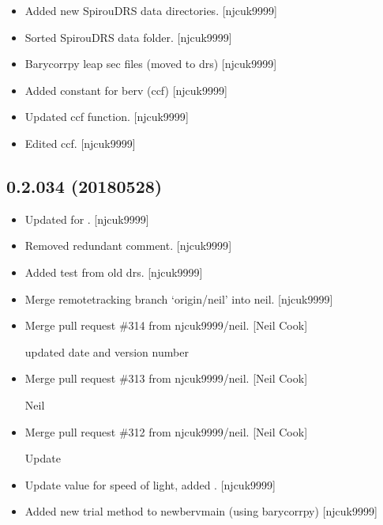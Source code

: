 \documentclass[a4paper,10pt,english]{report}
\begin{document}
\begin{itemize}
\item {} 
Added new SpirouDRS data directories. {[}njcuk9999{]}

\item {} 
Sorted SpirouDRS data folder. {[}njcuk9999{]}

\item {} 
Barycorrpy leap sec files (moved to drs) {[}njcuk9999{]}

\item {} 
Added constant for berv (ccf) {[}njcuk9999{]}

\item {} 
Updated ccf function. {[}njcuk9999{]}

\item {} 
Edited ccf. {[}njcuk9999{]}

\end{itemize}


\subsection{0.2.034 (2018\sphinxhyphen{}05\sphinxhyphen{}28)}
\label{\detokenize{misc/changelog:id447}}\begin{itemize}
\item {} 
Updated for . {[}njcuk9999{]}

\item {} 
Removed redundant comment. {[}njcuk9999{]}

\item {} 
Added test from old drs. {[}njcuk9999{]}

\item {} 
Merge remote\sphinxhyphen{}tracking branch ‘origin/neil’ into neil. {[}njcuk9999{]}

\item {} 
Merge pull request \#314 from njcuk9999/neil. {[}Neil Cook{]}

updated date and version number

\item {} 
Merge pull request \#313 from njcuk9999/neil. {[}Neil Cook{]}

Neil

\item {} 
Merge pull request \#312 from njcuk9999/neil. {[}Neil Cook{]}

Update 

\item {} 
Update value for speed of light, added .
{[}njcuk9999{]}

\item {} 
Added new trial method to newbervmain (using barycorrpy) {[}njcuk9999{]}

\end{itemize}
\end{document}
